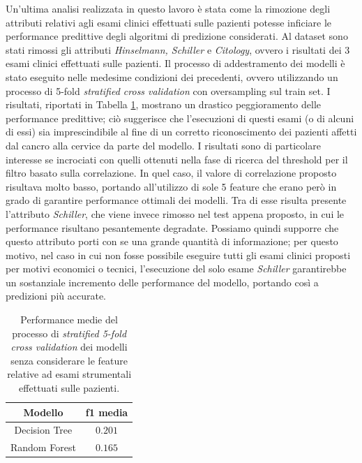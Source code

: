 Un'ultima analisi realizzata in questo lavoro è stata come la rimozione degli attributi relativi agli esami clinici effettuati sulle pazienti potesse inficiare le performance predittive degli algoritmi di predizione considerati. Al dataset sono stati rimossi gli attributi \textit{Hinselmann, Schiller} e \textit{Citology}, ovvero i risultati dei 3 esami clinici effettuati sulle pazienti. Il processo di addestramento dei modelli è stato eseguito nelle medesime condizioni dei precedenti, ovvero utilizzando un processo di 5-fold \textit{stratified cross validation} con oversampling sul train set. I risultati, riportati in Tabella \ref{tab:noexamsscore}, mostrano un drastico peggioramento delle performance predittive; ciò suggerisce che l'esecuzioni di questi esami (o di alcuni di essi) sia imprescindibile al fine di un corretto riconoscimento dei pazienti affetti dal cancro alla cervice da parte del modello.
I risultati sono di particolare interesse se incrociati con quelli ottenuti nella fase di ricerca del threshold per il filtro basato sulla correlazione. In quel caso, il valore di correlazione proposto risultava molto basso, portando all'utilizzo di sole 5 feature che erano però in grado di garantire performance ottimali dei modelli. Tra di esse risulta presente l'attributo \textit{Schiller}, che viene invece rimosso nel test appena proposto, in cui le performance risultano pesantemente degradate. Possiamo quindi supporre che questo attributo porti con se una grande quantità di informazione; per questo motivo, nel caso in cui non fosse possibile eseguire tutti gli esami clinici proposti per motivi economici o tecnici, l'esecuzione del solo esame \textit{Schiller} garantirebbe un sostanziale incremento delle performance del modello, portando così a predizioni più accurate.
\begin{table}
	\centering
	\caption{Performance medie del processo di \textit{stratified 5-fold cross validation} dei modelli senza considerare le feature relative ad esami strumentali effettuati sulle pazienti.}
	\label{tab:noexamsscore}
	\begin{tabular}{|c|c|}
		\toprule
		Modello & f1 media \\ 
		\midrule 
		Decision Tree & $0.201$ \\  
		Random Forest  & $0.165$ \\ 
		\bottomrule
	\end{tabular}
\end{table}


